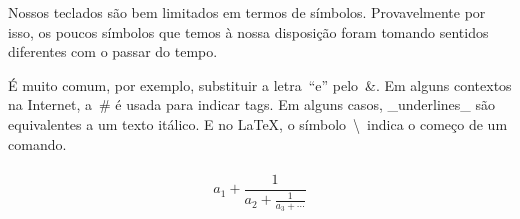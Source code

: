 \documentclass[12pt,a4paper,oneside]{article}
\begin{document}
Nossos teclados são bem limitados em termos de símbolos. Provavelmente por isso, os poucos símbolos que temos à nossa disposição foram tomando sentidos diferentes com o passar do tempo.

É muito comum, por exemplo, substituir a letra~``e'' pelo~\&. Em alguns contextos na Internet, a~\# é usada para indicar tags. Em alguns casos, \_underlines\_ são equivalentes a um texto itálico. E no \LaTeX, o símbolo~\textbackslash\ indica o começo de um comando.
\paragraph{
$$ a_1 + \frac{1}{a_2 + \frac{1}{a_3 + \cdots}} $$
}
\end{document}
